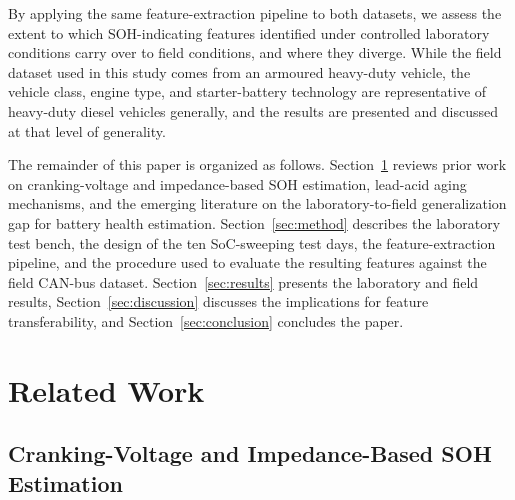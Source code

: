 \documentclass[conference]{IEEEtran}
\begin{document}
By applying the same feature-extraction pipeline to both datasets, we assess the extent to which SOH-indicating features identified under controlled laboratory conditions carry over to field conditions, and where they diverge. While the field dataset used in this study comes from an armoured heavy-duty vehicle, the vehicle class, engine type, and starter-battery technology are representative of heavy-duty diesel vehicles generally, and the results are presented and discussed at that level of generality.

The remainder of this paper is organized as follows. Section~\ref{sec:related} reviews prior work on cranking-voltage and impedance-based SOH estimation, lead-acid aging mechanisms, and the emerging literature on the laboratory-to-field generalization gap for battery health estimation. Section~\ref{sec:method} describes the laboratory test bench, the design of the ten SoC-sweeping test days, the feature-extraction pipeline, and the procedure used to evaluate the resulting features against the field CAN-bus dataset. Section~\ref{sec:results} presents the laboratory and field results, Section~\ref{sec:discussion} discusses the implications for feature transferability, and Section~\ref{sec:conclusion} concludes the paper.

\section{Related Work}
\label{sec:related}

\subsection{Cranking-Voltage and Impedance-Based SOH Estimation}
\end{document}
